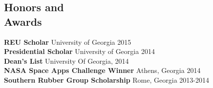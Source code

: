 \documentclass[margin,line]{resume}
\begin{document}
\begin{resume}
	\section{\mysidestyle Honors and\\Awards} 
	\textbf{REU Scholar} \hfill University of Georgia 2015\\
	\textbf{Presidential Scholar} \hfill University of Georgia 2014\\
	\textbf{Dean's List} \hfill University Of Georgia, 2014\\
	\textbf{NASA Space Apps Challenge Winner} \hfill Athens, Georgia 2014\\%
	\textbf{Southern Rubber Group Scholarship} \hfill Rome, Georgia 2013-2014
	     
	
	
	
	
	
	
	
	
	
	\end{resume}
	
\end{document}
